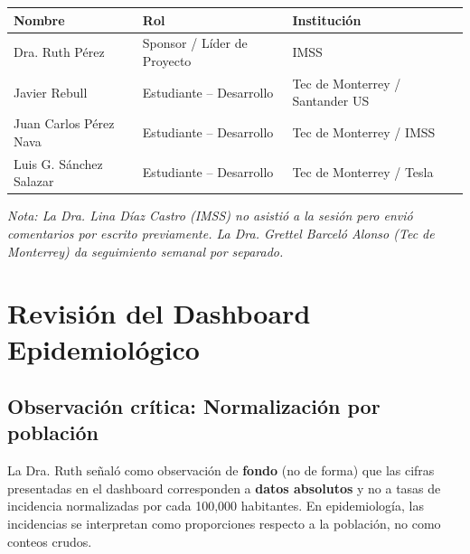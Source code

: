 \documentclass[11pt, a4paper]{article}
\begin{document}
\noindent
\begin{tabularx}{\textwidth}{l l X}
    \toprule
    \rowcolor{lightgray}
    \textbf{\color{imssgreen}Nombre} & \textbf{\color{imssgreen}Rol} & \textbf{\color{imssgreen}Institución} \\
    \midrule
    Dra. Ruth Pérez             & Sponsor / Líder de Proyecto     & IMSS \\
    \rowcolor{lightgray}
    Javier Rebull          & Estudiante -- Desarrollo     & Tec de Monterrey / Santander US \\
    Juan Carlos Pérez Nava      & Estudiante -- Desarrollo        & Tec de Monterrey / IMSS \\
    \rowcolor{lightgray}
    Luis G. Sánchez Salazar     & Estudiante -- Desarrollo        & Tec de Monterrey / Tesla \\
    \bottomrule
\end{tabularx}

\vspace{0.3cm}
\noindent
{\small\color{imssgray}\textit{Nota: La Dra. Lina Díaz Castro (IMSS) no asistió a la sesión pero envió comentarios por escrito previamente. La Dra. Grettel Barceló Alonso (Tec de Monterrey) da seguimiento semanal por separado.}}

\vspace{0.8cm}

\section{Revisión del Dashboard Epidemiológico}

\subsection{Observación crítica: Normalización por población}

La Dra. Ruth señaló como observación de \textbf{fondo} (no de forma) que las cifras presentadas en el dashboard corresponden a \textbf{datos absolutos} y no a tasas de incidencia normalizadas por cada 100,000 habitantes. En epidemiología, las incidencias se interpretan como proporciones respecto a la población, no como conteos crudos.
\end{document}
